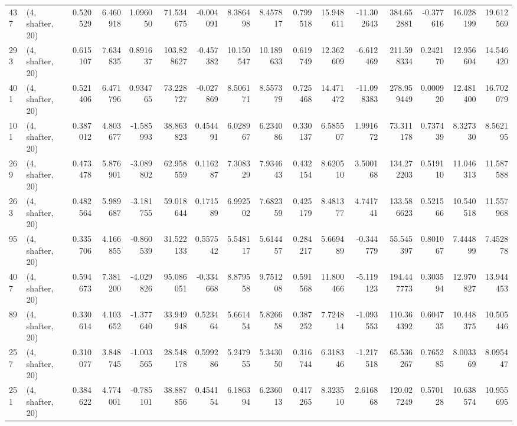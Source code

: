 \begin{tabular}{llrrrrrrrrrrrrrr}
437 &  (4, shafter, 20) &   0.520529 &   6.460918 &   1.096050 &    71.534675 &  -0.004091 &   8.386498 &   8.457817 &  0.799518 &  15.948611 & -11.302643 &   384.652881 & -0.377616 &  16.028199 &  19.612569 \\
293 &  (4, shafter, 20) &   0.615107 &   7.634835 &   0.891637 &   103.828627 &  -0.457382 &  10.150547 &  10.189633 &  0.619749 &  12.362609 &  -6.612469 &   211.598334 &  0.242170 &  12.956604 &  14.546420 \\
401 &  (4, shafter, 20) &   0.521406 &   6.471796 &   0.934765 &    73.228727 &  -0.027869 &   8.506171 &   8.557379 &  0.725468 &  14.471472 & -11.098383 &   278.959449 &  0.000920 &  12.481400 &  16.702079 \\
101 &  (4, shafter, 20) &   0.387012 &   4.803677 &  -1.585993 &    38.863823 &   0.454491 &   6.028967 &   6.234086 &  0.330137 &   6.585507 &   1.991672 &    73.311178 &  0.737439 &   8.327330 &   8.562195 \\
269 &  (4, shafter, 20) &   0.473478 &   5.876901 &  -3.089802 &    62.958559 &   0.116287 &   7.308329 &   7.934643 &  0.432154 &   8.620510 &   3.500168 &   134.272203 &  0.519110 &  11.046313 &  11.587588 \\
263 &  (4, shafter, 20) &   0.482564 &   5.989687 &  -3.181755 &    59.018644 &   0.171589 &   6.992502 &   7.682359 &  0.425179 &   8.481377 &   4.741741 &   133.586623 &  0.521566 &  10.540518 &  11.557968 \\
95  &  (4, shafter, 20) &   0.335706 &   4.166855 &  -0.860539 &    31.522133 &   0.557542 &   5.548117 &   5.614457 &  0.284217 &   5.669489 &  -0.344779 &    55.545397 &  0.801067 &   7.444899 &   7.452878 \\
407 &  (4, shafter, 20) &   0.594673 &   7.381200 &  -4.029826 &    95.086051 &  -0.334668 &   8.879558 &   9.751208 &  0.591568 &  11.800466 &  -5.119123 &   194.447773 &  0.303594 &  12.970827 &  13.944453 \\
89  &  (4, shafter, 20) &   0.330614 &   4.103652 &  -1.377640 &    33.949948 &   0.523464 &   5.661454 &   5.826658 &  0.387252 &   7.724814 &  -1.093553 &   110.364392 &  0.604735 &  10.448375 &  10.505446 \\
257 &  (4, shafter, 20) &   0.310077 &   3.848745 &  -1.003565 &    28.548178 &   0.599286 &   5.247955 &   5.343050 &  0.316744 &   6.318346 &  -1.217518 &    65.536267 &  0.765285 &   8.003369 &   8.095447 \\
251 &  (4, shafter, 20) &   0.384622 &   4.774001 &  -0.785101 &    38.887856 &   0.454154 &   6.186394 &   6.236013 &  0.417265 &   8.323510 &   2.616868 &   120.027249 &  0.570128 &  10.638574 &  10.955695 \\

\end{tabular}
